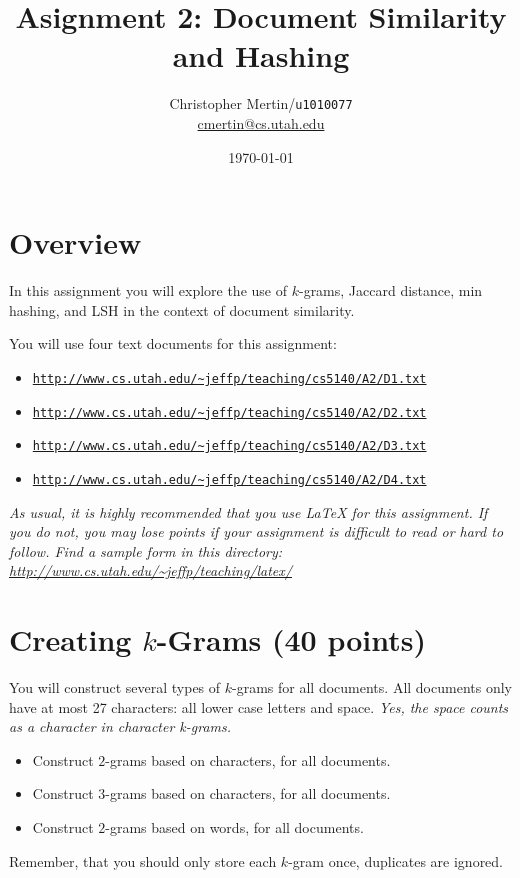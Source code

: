 \documentclass[11pt]{article}
\title{Asignment 2: Document Similarity and Hashing}
\author{Christopher Mertin/\verb~u1010077~\\\url{cmertin@cs.utah.edu}}
\date{\today}
\begin{document}
\maketitle





\section*{Overview}

In this assignment you will explore the use of $k$-grams, Jaccard distance, min hashing, and LSH in the context of document similarity.  

You will use four text documents for this assignment:
\begin{itemize} \denselist
\item \href{http://www.cs.utah.edu/~jeffp/teaching/cs5140/A2/D1.txt}{\texttt{http://www.cs.utah.edu/\~{}jeffp/teaching/cs5140/A2/D1.txt}}
\item \href{http://www.cs.utah.edu/~jeffp/teaching/cs5140/A2/D2.txt}{\texttt{http://www.cs.utah.edu/\~{}jeffp/teaching/cs5140/A2/D2.txt}}
\item \href{http://www.cs.utah.edu/~jeffp/teaching/cs5140/A2/D3.txt}{\texttt{http://www.cs.utah.edu/\~{}jeffp/teaching/cs5140/A2/D3.txt}}
\item \href{http://www.cs.utah.edu/~jeffp/teaching/cs5140/A2/D4.txt}{\texttt{http://www.cs.utah.edu/\~{}jeffp/teaching/cs5140/A2/D4.txt}}
\end{itemize}

\vspace{.1in}

\emph{As usual, it is highly recommended that you use LaTeX for this assignment.  If you do not, you may lose points if your assignment is difficult to read or hard to follow.  Find a sample form in this directory:
\url{http://www.cs.utah.edu/~jeffp/teaching/latex/}}


\section{Creating $k$-Grams (40 points)}

You will construct several types of $k$-grams for all documents.  All documents only have at most 27 characters: all lower case letters and space.    \emph{Yes, the space counts as a character in character k-grams.}
\begin{itemize} \denselist
\item[\s{[G1]}] Construct $2$-grams based on characters, for all documents.  
\item[\s{[G2]}] Construct $3$-grams based on characters, for all documents.
\item[\s{[G3]}] Construct $2$-grams based on words, for all documents.  
\end{itemize}
Remember, that you should only store each $k$-gram once, duplicates are ignored.  
\end{document}
